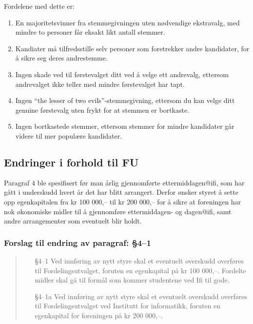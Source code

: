 \documentclass[10pt,norsk,a4paper]{article}
\begin{document}
Fordelene med dette er:
\begin{enumerate}
	\item En majoritetsvinner fra stemmegivningen uten nødvendige ekstravalg, med mindre to personer får eksakt likt antall stemmer.
	\item Kandiater må tilfredsstille selv personer som foretrekker andre kandidater, for å sikre seg deres andrestemme.
	\item Ingen skade ved til førstevalget ditt ved å velge ett andrevalg, ettersom andrevalget ikke teller med mindre førstevalget har tapt.
	\item Ingen ``the lesser of two evils''-stemmegivning, ettersom du kan velge ditt genuine førstevalg uten frykt for at stemmen er bortkaste.
	\item Ingen bortkastede stemmer, ettersom stemmer for mindre kandidater går videre til mer populære kandidater.
\end{enumerate}

\subsection{Endringer i forhold til FU}
Paragraf 4 ble spesifisert før man årlig gjennomførte ettermiddagen@ifi, som har gått i underskudd hvert år det har blitt arrangert. Derfor ønsker styret å sette opp egenkapitalen fra kr 100 000,– til kr 200 000,– for å sikre at foreningen har nok økonomiske midler til å gjennomføre ettermiddagen- og dagen@ifi, samt andre arrangementer som eventuelt blir holdt.

\subsubsection{Forslag til endring av paragraf: §4--1}
\begin{quote}
	\begin{enumerate}
        \item[§4--1] Ved innføring av nytt styre skal et eventuelt overskudd overføres til Fordelingsutvalget, foruten en egenkapital på kr 100 000,–. Fordelte midler skal gå til formål som kommer studentene ved Ifi til gode.
        \item[§4--1a] Ved innføring av nytt styre skal et eventuelt overskudd overføres til Fordelingsutvalget ved Institutt for informatikk, foruten en egenkapital for foreningen på kr 200 000,–.
	\end{enumerate}
\end{quote}
\end{document}
